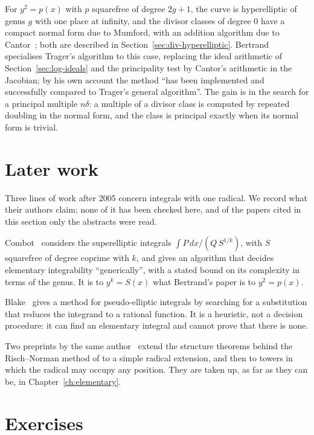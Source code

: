 For $y^2 = p(x)$ with $p$ squarefree of degree $2g + 1$, the curve is
hyperelliptic of genus $g$ with one place at infinity, and the divisor
classes of degree $0$ have a compact normal form due to Mumford, with an
addition algorithm due to Cantor~\cite{cantor1987}; both are described in
Section~\ref{sec:div-hyperelliptic}. Bertrand~\cite{bertrand1995} specialises Trager's
algorithm to this case, replacing the ideal arithmetic of
Section~\ref{sec:log-ideals} and the principality test by Cantor's
arithmetic in the Jacobian; by his own account the method ``has been
implemented and successfully compared to Trager's general algorithm''. The
gain is in the search for a principal multiple $n \delta$: a multiple of a divisor class is computed by
repeated doubling in the normal form, and the class is principal exactly when
its normal form is trivial.

\section{Later work\later}\label{sec:radical-later}

Three lines of work after 2005 concern integrals with one radical. We record
what their authors claim; none of it has been checked here, and of the
papers cited in this section only the abstracts were read.

Combot~\cite{combot2021} considers the superelliptic integrals $\int P\,dx /
(Q\, S^{1/k})$, with $S$ squarefree of degree coprime with $k$, and gives an algorithm that decides elementary integrability
``generically'', with a stated bound on its complexity in terms of the genus.
It is to $y^k = S(x)$ what Bertrand's paper is to $y^2 = p(x)$.

Blake~\cite{blake2020} gives a method for pseudo-elliptic integrals by
searching for a substitution that reduces the integrand to a rational
function. It is a heuristic, not a decision procedure: it can find an
elementary integral and cannot prove that there is none.

Two preprints by the same author~\cite{blake2026a,blake2026b} extend the structure theorems behind the
Risch--Norman method of  to a simple radical extension, and
then to towers in which the radical may occupy any position. They are
taken up, as far as they can be, in Chapter~\ref{ch:elementary}.

\section*{Exercises}

